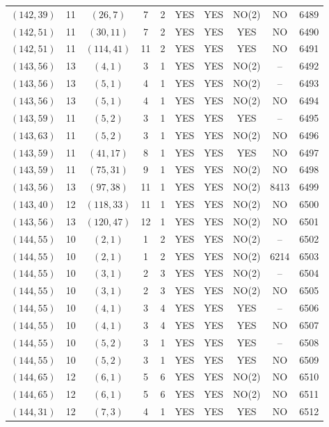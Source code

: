 \begin{longtable}{|c|c|c|c|c|c|c|c|c|c|}
$(142, 39)$ & 11 & $(26, 7)$ & 7 & 2 & YES & YES & NO(2) & NO & 6489\\
$(142, 51)$ & 11 & $(30, 11)$ & 7 & 2 & YES & YES & YES & NO & 6490\\
$(142, 51)$ & 11 & $(114, 41)$ & 11 & 2 & YES & YES & YES & NO & 6491\\
$(143, 56)$ & 13 & $(4, 1)$ & 3 & 1 & YES & YES & NO(2) & -- & 6492\\
$(143, 56)$ & 13 & $(5, 1)$ & 4 & 1 & YES & YES & NO(2) & -- & 6493\\
$(143, 56)$ & 13 & $(5, 1)$ & 4 & 1 & YES & YES & NO(2) & NO & 6494\\
$(143, 59)$ & 11 & $(5, 2)$ & 3 & 1 & YES & YES & YES & -- & 6495\\
$(143, 63)$ & 11 & $(5, 2)$ & 3 & 1 & YES & YES & NO(2) & NO & 6496\\
$(143, 59)$ & 11 & $(41, 17)$ & 8 & 1 & YES & YES & YES & NO & 6497\\
$(143, 59)$ & 11 & $(75, 31)$ & 9 & 1 & YES & YES & NO(2) & NO & 6498\\
$(143, 56)$ & 13 & $(97, 38)$ & 11 & 1 & YES & YES & NO(2) & 8413 & 6499\\
$(143, 40)$ & 12 & $(118, 33)$ & 11 & 1 & YES & YES & NO(2) & NO & 6500\\
$(143, 56)$ & 13 & $(120, 47)$ & 12 & 1 & YES & YES & NO(2) & NO & 6501\\
$(144, 55)$ & 10 & $(2, 1)$ & 1 & 2 & YES & YES & NO(2) & -- & 6502\\
$(144, 55)$ & 10 & $(2, 1)$ & 1 & 2 & YES & YES & NO(2) & 6214 & 6503\\
$(144, 55)$ & 10 & $(3, 1)$ & 2 & 3 & YES & YES & NO(2) & -- & 6504\\
$(144, 55)$ & 10 & $(3, 1)$ & 2 & 3 & YES & YES & NO(2) & NO & 6505\\
$(144, 55)$ & 10 & $(4, 1)$ & 3 & 4 & YES & YES & YES & -- & 6506\\
$(144, 55)$ & 10 & $(4, 1)$ & 3 & 4 & YES & YES & YES & NO & 6507\\
$(144, 55)$ & 10 & $(5, 2)$ & 3 & 1 & YES & YES & YES & -- & 6508\\
$(144, 55)$ & 10 & $(5, 2)$ & 3 & 1 & YES & YES & YES & NO & 6509\\
$(144, 65)$ & 12 & $(6, 1)$ & 5 & 6 & YES & YES & NO(2) & NO & 6510\\
$(144, 65)$ & 12 & $(6, 1)$ & 5 & 6 & YES & YES & NO(2) & NO & 6511\\
$(144, 31)$ & 12 & $(7, 3)$ & 4 & 1 & YES & YES & YES & NO & 6512\\

\end{longtable}
